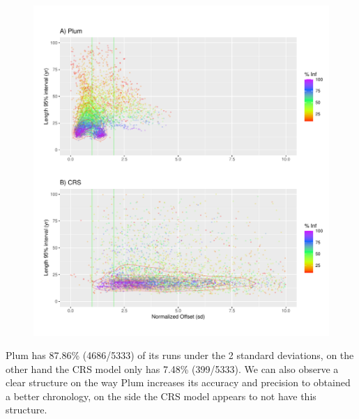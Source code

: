 \documentclass [11pt] {article}
\begin{document}
\begin{figure}
 \centering
  \includegraphics[width=\linewidth]{Maps.pdf}
  \caption{}
  \label{fig:accpre}
\end{figure}

Plum has 87.86\% (4686/5333) of its runs under the 2 standard deviations, on the other hand the CRS model only has 7.48\% (399/5333).
We can also observe a clear structure on the way Plum increases its accuracy and precision to obtained a better chronology, on the side the CRS model appears to not have this structure. 



\newpage
\end{document}
